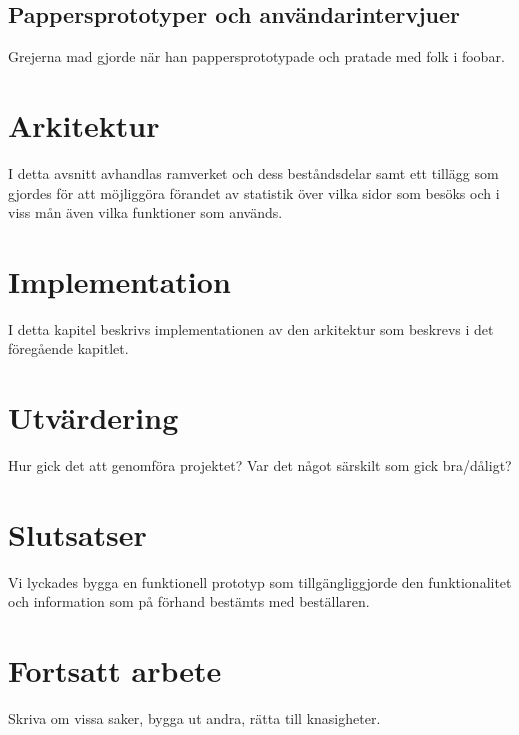 \documentclass[11pt,a4paper]{report}
\begin{document}


\section{Pappersprototyper och användarintervjuer}
Grejerna mad gjorde när han pappersprototypade och pratade med folk i
foobar.




\chapter{Arkitektur}
I detta avsnitt avhandlas ramverket och dess beståndsdelar samt ett
tillägg som gjordes för att möjliggöra förandet av statistik över vilka
sidor som besöks och i viss mån även vilka funktioner som används.



\chapter{Implementation}
I detta kapitel beskrivs implementationen av den arkitektur som beskrevs
i det föregående kapitlet.






\chapter{Utvärdering}
Hur gick det att genomföra projektet? Var det något särskilt som gick
bra/dåligt?




\chapter{Slutsatser}
Vi lyckades bygga en funktionell prototyp som tillgängliggjorde den
funktionalitet och information som på förhand bestämts med beställaren.




\chapter{Fortsatt arbete}
Skriva om vissa saker, bygga ut andra, rätta till knasigheter.

\end{document}
